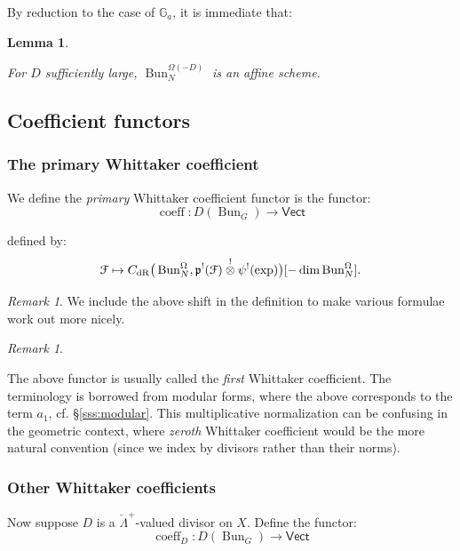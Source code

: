 \documentclass[reqno,11pt]{amsart}
\numberwithin{equation}{subsection}
\newtheorem{lem}[thm]{Lemma}
\theoremstyle{remark}
\newtheorem{rem}[thm]{Remark}
\newcommand{\bG}{{\mathbb G}}
\newcommand{\sF}{{\EuScript F}}
\newcommand{\fp}{{\mathfrak p}}
\newcommand{\on}{\operatorname}
\newcommand{\Vect}{\mathsf{Vect}}
\newcommand{\Bun}{\on{Bun}}
\newcommand{\coeff}{\on{coeff}}
\newcommand{\dR}{\on{dR}}
\begin{document}
By reduction to the case of $\bG_a$, it is immediate that:

\begin{lem}\label{l:large-div}

For $D$ sufficiently large, $\Bun_N^{\Omega(-D)}$ is an affine scheme.

\end{lem}

\subsection{Coefficient functors}

\subsubsection{The primary Whittaker coefficient}

We define the \emph{primary} Whittaker coefficient functor is the functor:
%
\[
\coeff:D(\Bun_G) \to \Vect
\]

\noindent defined by:
%
\[
\sF \mapsto 
C_{\dR}\big(\Bun_N^{\Omega},\fp^!(\sF) \overset{!}{\otimes} \psi^!(\exp)\big)
[-\dim  \Bun_N^{\Omega}].
\]

\begin{rem}

We include the above shift in the definition to make various formulae
work out more nicely. 

\end{rem} 

\begin{rem}\label{r:first?}

The above functor is usually called the \emph{first} Whittaker coefficient.
The terminology is borrowed from modular forms, where the above
corresponds to the term $a_1$, cf. \S \ref{sss:modular}. This multiplicative 
normalization
can be confusing in the geometric context, where \emph{zeroth} Whittaker
coefficient would be the more natural convention (since we index
by divisors rather than their norms).

\end{rem}

\subsubsection{Other Whittaker coefficients}

Now suppose $D$ is a $\check{\Lambda}^+$-valued divisor on 
$X$. Define the functor:
%
\[
\coeff_D: D(\Bun_G) \to \Vect
\]
\end{document}
